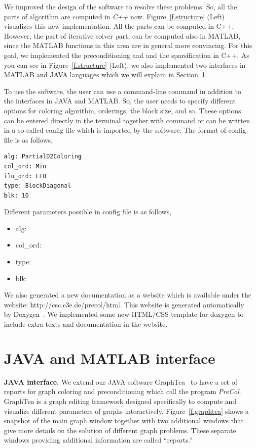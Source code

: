 \documentclass[12pt, oneside]{book}
\begin{document}
We improved the design of the software to resolve these problems.
So, all the parts of algorithm are computed in \textit{C++} now.
Figure~\ref{f.structure} (Left) visualizes this new implementation.
All the parts can be computed in C++. However, 
the part of iterative solver part, can be computed also in MATLAB,
since the MATLAB functions in this area are in general more convincing. 
For this goal, we implemented the preconditioning and 
and the sparsification in C++. 
As you can see in Figure~\ref{f.structure} (Left), we also implemented
two interfaces in MATLAB and JAVA languages which we will explain in 
Section~\ref{s.interfaces}.

To use the software, the user can use a command-line command in addition to
the interfaces in JAVA and MATLAB. So, the user needs to specify different
options for coloring algorithm, orderings, the block size, and so.
These options can be entered directly in the terminal together with command
or can be written in a so called config file which is imported by the software. 
The format of config file is as follows,
\begin{lstlisting}
alg: PartialD2Coloring
col_ord: Min
ilu_ord: LFO
type: BlockDiagonal
blk: 10
\end{lstlisting}
Different parameters possible in config file is as follows,
\begin{itemize}
\item alg:
\item col\_ord: 
\item type:
\item blk:
\end{itemize}

We also generated a new documentation as a website which is available
under the website: http://csc.c3e.de/precol/html.
This website is generated automatically by Doxygen~\cite{Lischner2013}.
We implemented some new HTML/CSS template for doxygen to include extra
texts and documentation in the website.

\section{JAVA and MATLAB interface}
\label{s.interfaces}
\textbf{JAVA interface.}
We extend our JAVA software GraphTea~
\cite{2014:07,2014:15,2014:16,2015:05,2015:06,2015:07,2015:08} to have a
set of reports for graph coloring and preconditioning which call the program
\textit{PreCol}.
GraphTea is a graph editing framework designed specifically to compute and visualize
different parameters of graphs interactively.
Figure~\ref{f.graphtea} shows a snapshot of the main
graph window together with two additional windows that give more details on the solution
of different graph problems. These separate windows providing additional information are
called ``reports.''
\end{document}
